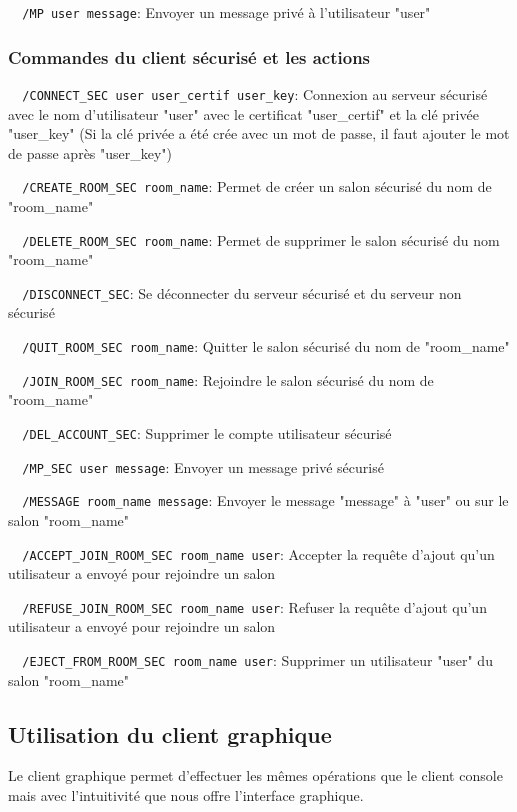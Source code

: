 \documentclass[a4paper,11pt,french]{book}
\begin{document}
\verb+	/MP user message+: Envoyer un message privé à l'utilisateur "user"
			
\subsubsection{Commandes du client sécurisé et les actions}

\verb+	/CONNECT_SEC user user_certif user_key+: Connexion au serveur sécurisé avec le nom d'utilisateur "user" avec le certificat "user\_certif" et la clé privée "user\_key" (Si la clé privée a été crée avec un mot de passe, il faut ajouter le mot de passe après "user\_key")

\verb+	/CREATE_ROOM_SEC room_name+: Permet de créer un salon sécurisé du nom de "room\_name"

\verb+	/DELETE_ROOM_SEC room_name+: Permet de supprimer le salon sécurisé du nom "room\_name"

\verb+	/DISCONNECT_SEC+: Se déconnecter du serveur sécurisé et du serveur non sécurisé

\verb+	/QUIT_ROOM_SEC room_name+: Quitter le salon sécurisé du nom de "room\_name"

\verb+	/JOIN_ROOM_SEC room_name+: Rejoindre le salon sécurisé du nom de "room\_name"

\verb+	/DEL_ACCOUNT_SEC+: Supprimer le compte utilisateur sécurisé

\verb+	/MP_SEC user message+: Envoyer un message privé sécurisé

\verb+	/MESSAGE room_name message+: Envoyer le message "message" à "user" ou sur le salon "room\_name"

\verb+	/ACCEPT_JOIN_ROOM_SEC room_name user+: Accepter la requête d'ajout qu'un utilisateur a envoyé pour rejoindre un salon

\verb+	/REFUSE_JOIN_ROOM_SEC room_name user+: Refuser la requête d'ajout qu'un utilisateur a envoyé pour rejoindre un salon

\verb+	/EJECT_FROM_ROOM_SEC room_name user+: Supprimer un utilisateur "user" du salon "room\_name"


\subsection{Utilisation du client graphique}

Le client graphique permet d'effectuer les mêmes opérations que le client console mais avec l'intuitivité que nous offre l'interface graphique.
\end{document}
